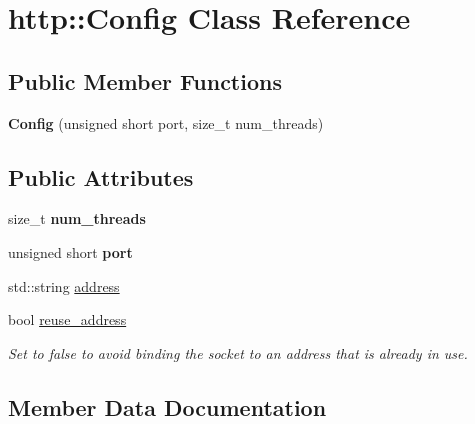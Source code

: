\hypertarget{classhttp_1_1_config}{}\section{http\+:\+:Config Class Reference}
\label{classhttp_1_1_config}
\subsection*{Public Member Functions}
\begin{DoxyCompactItemize}
\item 
\mbox{\label{classhttp_1_1_config_a75978d0e657de5df23aa267234500bdd}} 
{\bfseries Config} (unsigned short port, size\+\_\+t num\+\_\+threads)
\end{DoxyCompactItemize}
\subsection*{Public Attributes}
\begin{DoxyCompactItemize}
\item 
\mbox{\label{classhttp_1_1_config_a53fb30a2ad7d7014318156529ce9d2fc}} 
size\+\_\+t {\bfseries num\+\_\+threads}
\item 
\mbox{\label{classhttp_1_1_config_a814afbe0d0d46ca00ae3849a5b76dd69}} 
unsigned short {\bfseries port}
\item 
std\+::string \hyperlink{classhttp_1_1_config_a2828c9d246da0710621a7bbc26ecab93}{address}
\item 
\mbox{\label{classhttp_1_1_config_a2956647487734a4a2c22743bdd898a97}} 
bool \hyperlink{classhttp_1_1_config_a2956647487734a4a2c22743bdd898a97}{reuse\+\_\+address}
\begin{DoxyCompactList}\small\item\em Set to false to avoid binding the socket to an address that is already in use. \end{DoxyCompactList}\end{DoxyCompactItemize}


\subsection{Member Data Documentation}
\mbox{\label{classhttp_1_1_config_a2828c9d246da0710621a7bbc26ecab93}} 
